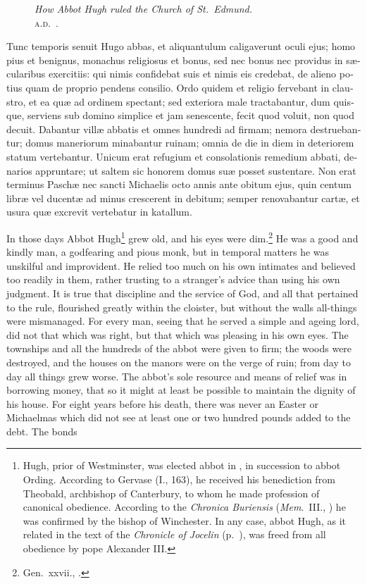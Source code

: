 \documentclass[10pt]{book}
\newcommand{\blockhead}[4][]{
\begin{figure}
\centering
\vspace{#4}
\parbox{2.75cm}{\begin{center}\footnotesize \color{BrickRed} \emph{#2}\\ #1 \end{center}}
\end{figure}
}
\begin{document}
\begin{paracol}{2}

\begin{otherlanguage}{latin}
\blockhead[\textsc{a.d}.\ .]{How Abbot Hugh ruled the Church of St.\ Edmund.}{4}{-0.45cm}
Tunc temporis senuit Hugo abbas, et aliquantulum caligaverunt oculi ejus; homo pius et benignus, monachus religiosus et bonus, sed nec bonus nec providus in s\ae{}cularibus exercitiis: qui nimis confidebat suis et nimis eis credebat, de alieno potius quam de proprio pendens consilio. Ordo quidem et religio fervebant in claustro, et ea qu\ae{} ad ordinem spectant; sed exteriora male tractabantur, dum quisque, serviens sub domino simplice et jam senescente, fecit quod voluit, non quod decuit. Dabantur vill\ae{} abbatis et omnes hundredi ad firmam; nemora destruebantur; domus maneriorum minabantur ruinam; omnia de die in diem in deteriorem statum vertebantur. Unicum erat refugium et consolationis remedium abbati, denarios appruntare; ut saltem sic honorem domus su\ae{} posset sustentare. Non erat terminus Pasch\ae{} nec sancti Michaelis octo annis ante obitum ejus, quin centum libr\ae{} vel ducent\ae{} ad minus crescerent in debitum; semper renovabantur cart\ae{}, et usura qu\ae{} excrevit vertebatur in katallum.\linebreak{}

\end{otherlanguage}

\switchcolumn

In those days Abbot Hugh\footnote{Hugh, prior of Westminster, was elected abbot in , in succession to abbot Ording. According to Gervase (I., 163), he received his benediction from Theobald, archbishop of Canterbury, to whom he made profession of canonical obedience. According to the \emph{Chronica Buriensis} (\emph{Mem}.\ III., ) he was confirmed by the bishop of Winchester. In any case, abbot Hugh, as it related in the text of the \emph{Chronicle of Jocelin} (p.\ ), was freed from all obedience by pope Alexander III.} grew old, and his eyes were dim.\footnote{Gen.\ xxvii., .} He was a good and kindly man, a godfearing and pious monk, but in temporal matters he was unskilful and improvident. He relied too much on his own intimates and believed too readily in them, rather trusting to a stranger's advice than using his own judgment. It is true that discipline and the service of God, and all that pertained to the rule, flourished greatly within the cloister, but without the walls all-things were mismanaged. For every man, seeing that he served a simple and ageing lord, did not that which was right, but that which was pleasing in his own eyes. The townships and all the hundreds of the abbot were given to firm; the woods were destroyed, and the houses on the manors were on the verge of ruin; from day to day all things grew worse. The abbot's sole resource and means of relief was in borrowing money, that so it might at least be possible to maintain the dignity of his house. For eight years before his death, there was never an Easter or Michaelmas which did not see at least one or two hundred pounds added to the debt. The bonds\linebreak{}


\end{paracol}
\end{document}
